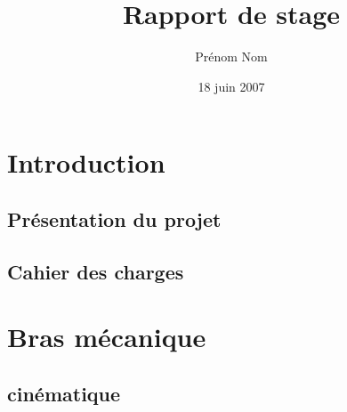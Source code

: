 \documentclass[a4paper, titlepage]{report}
\title{Rapport de stage}      %
\author{Prénom Nom}           %
\date{18 juin 2007}           %
\begin{document}
	 
	\chapter {Introduction}
		\section {Présentation du projet}
		\section {Cahier des charges}
	\chapter {Bras mécanique}
		\section {cinématique}
\end{document}
